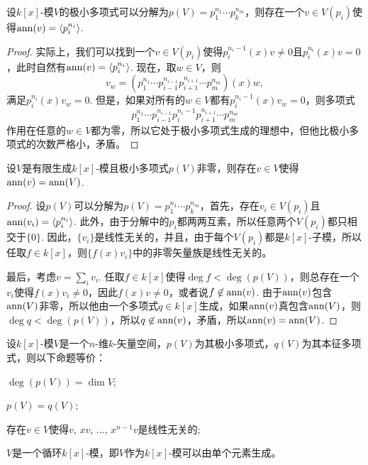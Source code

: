 \begin{lem}\label{lem:6.3.9}
    设$k[x]$-模$V$的极小多项式可以分解为$p(V)=p_1^{n_1}\cdots p_k^{n_m}$，则存在一个$v\in V(p_i)$使得$\operatorname{ann}(v)=\langle p_i^{n_i}\rangle$.
\end{lem}

\begin{proof}
    实际上，我们可以找到一个$v\in V(p_i)$使得$p_i^{n_i-1}(x)v\neq 0$且$p_i^{n_i}(x)v=0$，此时自然有$\operatorname{ann}(v)=\langle p_i^{n_i}\rangle$. 现在，取$w\in V$，则
    \[
        v_w=\left(p_1^{n_1}\cdots p_{i-1}^{n_{i-1}}p_{i+1}^{n_{i+1}}\cdots p_{m}^{n_{m}}\right)(x)w,
    \]
    满足$p_i^{n_i}(x)v_w=0$. 但是，如果对所有的$w\in V$都有$p_i^{n_i-1}(x)v_w=0$，则多项式
    \[
        p_1^{n_1}\cdots p_{i-1}^{n_{i-1}}p_i^{n_i-1}p_{i+1}^{n_{i+1}}\cdots p_{m}^{n_{m}}
    \]
    作用在任意的$w\in V$都为零，所以它处于极小多项式生成的理想中，但他比极小多项式的次数严格小，矛盾。
\end{proof}

\begin{pro}\label{pro:6.3.6}
    设$V$是有限生成$k[x]$-模且极小多项式$p(V)$非零，则存在$v\in V$使得$\operatorname{ann}(v)=\operatorname{ann}(V)$.
\end{pro}

\begin{proof}
    设$p(V)$可以分解为$p(V)=p_1^{n_1}\cdots p_k^{n_m}$，首先，存在$v_i\in V(p_i)$且$\operatorname{ann}(v_i)=\langle p_i^{n_i}\rangle$. 此外，由于分解中的$p_i$都两两互素，所以任意两个$V(p_i)$都只相交于$\{0\}$. 因此，$\{v_i\}$是线性无关的，并且，由于每个$V(p_i)$都是$k[x]$-子模，所以任取$f\in k[x]$，则$\{f(x)v_i\}$中的非零矢量族是线性无关的。

    最后，考虑$v=\sum_i v_i$. 任取$f\in k[x]$使得$\deg f<\deg (p(V))$，则总存在一个$v_i$使得$f(x)v_i\neq 0$，因此$f(x)v\neq 0$，或者说$f\not\in \operatorname{ann}(v)$. 由于$\operatorname{ann}(v)$包含$\operatorname{ann}(V)$非零，所以他由一个多项式$q\in k[x]$生成，如果$\operatorname{ann}(v)$真包含$\operatorname{ann}(V)$，则$\deg q< \deg (p(V))$，所以$q\not\in \operatorname{ann}(v)$，矛盾，所以$\operatorname{ann}(v)=\operatorname{ann}(V)$.
\end{proof}

\begin{pro}\label{pro:6.3.7}
    设$k[x]$-模$V$是一个$n$-维$k$-矢量空间，$p(V)$为其极小多项式，$q(V)$为其本征多项式，则以下命题等价：
    \begin{compactenum}
        \item $\deg(p(V))=\dim V$;
        \item $p(V)=q(V)$;
        \item 存在$v\in V$使得$v$, $xv$, $\dots$, $x^{n-1}v$是线性无关的;
        \item $V$是一个循环$k[x]$-模，即$V$作为$k[x]$-模可以由单个元素生成。
    \end{compactenum}
\end{pro}

